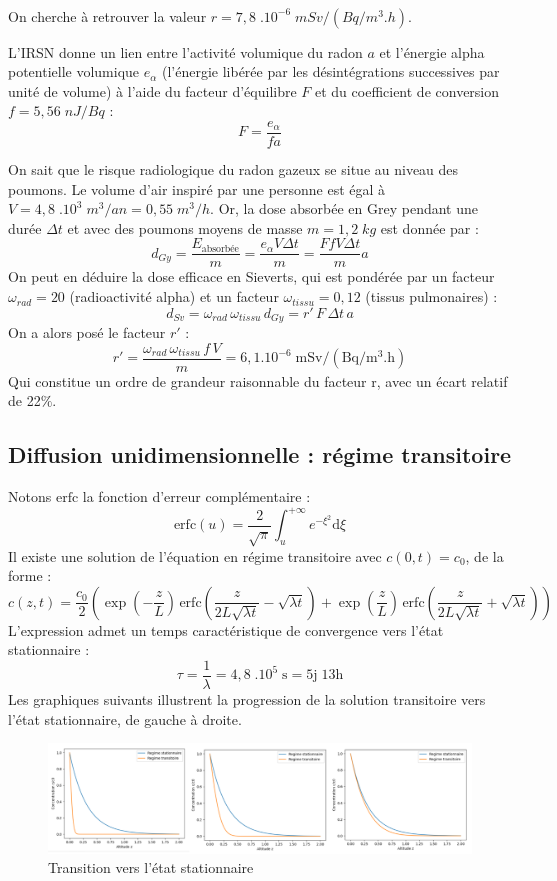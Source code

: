 \documentclass{article}
\begin{document}
\paragraph{} On cherche à retrouver la valeur $r=7,8 \; .10^{-6} \; mSv/(Bq/m^3.h)$.

L’IRSN donne un lien \cite{irsn_ineris_radon_nodate} entre l’activité volumique du radon $a$ et l’énergie alpha potentielle volumique $e_{\alpha}$ (l’énergie libérée par les désintégrations successives par unité de volume) à l’aide du facteur d’équilibre $F$ et du coefficient de conversion $f=5,56 \; nJ/Bq$ :
$$
F=\frac{e_{\alpha}}{f a}
$$

On sait que le risque radiologique du radon gazeux se situe au niveau des poumons. Le volume d’air inspiré par une personne est égal à $V=4,8 \;.10^3 \;  m^3/an=0,55 \; m^3/h $. Or, la dose absorbée en Grey pendant une durée $\Delta t$ et avec des poumons moyens de masse $m=1,2 \; kg$ est donnée par :
$$
d_{Gy}=\frac{E_{\text{absorbée}}}{m}=\frac{e_{\alpha} V \Delta t}{m}=\frac{FfV\Delta t}{m}a
$$
On peut en déduire la dose efficace en Sieverts, qui est pondérée par un facteur $\omega_{rad}=20$ (radioactivité alpha) et un facteur $\omega_{tissu}=0,12$ (tissus pulmonaires) :
$$
d_{Sv}=\omega_{rad}\, \omega_{tissu} \, d_{Gy} = r'\,F\, \Delta t\, a
$$
On a alors posé le facteur $r'$ :
$$
r'= \frac{\omega_{rad}\, \omega_{tissu}\,  f\,V}{m}=6,1.10^{-6} \; \text{m}\text{Sv}/(\text{Bq}/\text{m}^3.\text{h})
$$
Qui constitue un ordre de grandeur raisonnable du facteur r, avec un écart relatif de 22$\%$.

\subsection{Diffusion unidimensionnelle : régime transitoire}

Notons $\text{erfc}$ la fonction d’erreur complémentaire :
$$
\text{erfc}(u)=\frac{2}{\sqrt{\pi}} \int_{u}^{+\infty } e^{-\xi^2} \text{d}\xi
$$
Il existe une solution de l’équation en régime transitoire avec $c(0,t)=c_0$, de la forme :
$$
c(z,t)=\frac{c_0}{2} \left( \exp\!\left(-\frac{z}{L}\right) \, \text{erfc}\!\left(\frac{z}{2L\sqrt{ \lambda t}} - \sqrt{\lambda t}\right) + \exp\!\left(\frac{z}{L}\right) \, \text{erfc}\!\left(\frac{z}{2L\sqrt{\lambda t}} + \sqrt{\lambda t} \right) \right)
$$
L’expression admet un temps caractéristique de convergence vers l’état stationnaire :
$$
\tau=\frac{1}{\lambda}=4,8 \; .10^5 \; \text{s}=5\text{j} \; 13\text{h}
$$
Les graphiques suivants illustrent la progression de la solution transitoire vers l'état stationnaire, de gauche à droite.
\begin{figure}[H]
    \centering
    \includegraphics[width = \linewidth]{III_C_3.png}
    \caption{Transition vers l'état stationnaire}
    \label{fig:diffusion_transitoire}
\end{figure}
\end{document}

